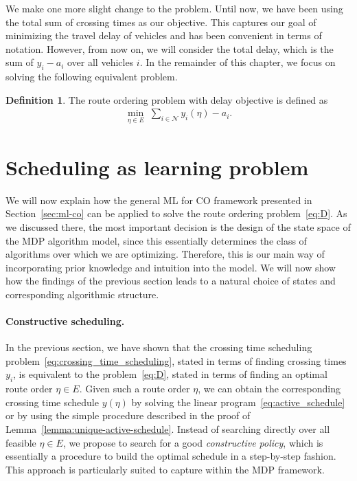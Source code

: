 \documentclass[a4paper]{report}
\theoremstyle{definition}
\newtheorem{define}{Definition}[chapter]
\theoremstyle{plain}
\begin{document}
We make one more slight change to the problem. Until now, we have been using the
total sum of crossing times as our objective. This captures our goal of
minimizing the travel delay of vehicles and has been convenient in terms of
notation. However, from now on, we will consider the total delay, which is the
sum of $y_i - a_i$ over all vehicles $i$.
%
In the remainder of this chapter, we focus on solving the following equivalent
problem.

\begin{define}
  The route ordering problem with delay objective is defined as
  \begin{align}
    \label{eq:D}\tag{D}
    \min_{\eta \in E} \; \sum_{i \in \mathcal{N}} y_i(\eta) - a_i .
  \end{align}
\end{define}

\clearpage

\section{Scheduling as learning problem}\label{sec:seq-modeling}

We will now explain how the general ML for CO framework presented in Section~\ref{sec:ml-co}
can be applied to solve the route ordering problem~\eqref{eq:D}.
%
As we discussed there, the most important decision is the design of the state
space of the MDP algorithm model, since this essentially determines the class of
algorithms over which we are optimizing. Therefore, this is our main way of
incorporating prior knowledge and intuition into the model.
%
We will now show how the findings of the previous section leads to a natural
choice of states and corresponding algorithmic structure.

\paragraph{Constructive scheduling.}
In the previous section, we have shown that the crossing time scheduling
problem~\eqref{eq:crossing_time_scheduling}, stated in terms of finding crossing times $y_i$, is equivalent to
the problem~\eqref{eq:D}, stated in terms of finding an optimal route order $\eta \in E$.
Given such a route order $\eta$, we can obtain the corresponding crossing time
schedule $y(\eta)$ by solving the linear program~\eqref{eq:active_schedule} or by using the simple
procedure described in the proof of Lemma~\ref{lemma:unique-active-schedule}.
%
Instead of searching directly over all feasible $\eta \in E$, we propose to search
for a good \emph{constructive policy}, which is essentially a procedure to build the
optimal schedule in a step-by-step fashion. This approach is particularly suited
to capture within the MDP framework.
\end{document}
